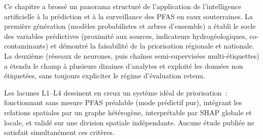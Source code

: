 \label{sec:synthese-chap2}

Ce chapitre a bross\'e un panorama structur\'e de l'application de l'intelligence artificielle \`a la pr\'ediction et \`a la surveillance des PFAS en eaux souterraines.
La premi\`ere g\'en\'eration (mod\`eles probabilistes et arbres d'ensemble) a \'etabli le socle des variables pr\'edictives (proximit\'e aux sources, indicateurs hydrog\'eologiques, co-contaminants) et d\'emontr\'e la faisabilit\'e de la priorisation r\'egionale et nationale.
La deuxi\`eme (r\'eseaux de neurones, puis cha\^ines semi-supervis\'ees multi-\'etiquettes) a \'etendu le champ \`a plusieurs dizaines d'analytes et exploit\'e les donn\'ees non \'etiquet\'ees, sans toujours expliciter le r\'egime d'\'evaluation retenu.

Les lacunes L1--L4 dessinent en creux un syst\`eme id\'eal de priorisation~: fonctionnant sans mesure PFAS pr\'ealable (mode pr\'edictif pur), int\'egrant les relations spatiales par un graphe h\'et\'erog\`ene, interpr\'etable par SHAP globale et locale, et valid\'e sur une division spatiale ind\'ependante.
Aucune \'etude publi\'ee ne satisfait simultan\'ement ces crit\`eres.

